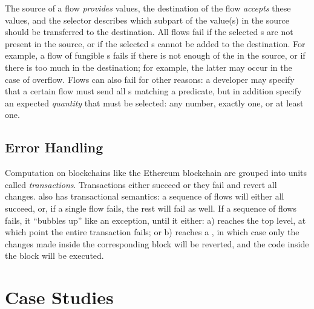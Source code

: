 \documentclass[dvipsnames, usenames, sigconf]{acmart}
\begin{document}
The source of a flow \emph{provides} values, the destination of the flow \emph{accepts} these values, and the selector describes which subpart of the value(s) in the source should be transferred to the destination.
All flows fail if the selected \assetTxt{}s are not present in the source, or if the selected \assetTxt{}s cannot be added to the destination.
For example, a flow of fungible \assetTxt{}s fails if there is not enough of the \assetTxt in the source, or if there is too much in the destination; for example, the latter may occur in the case of overflow.
Flows can also fail for other reasons: a developer may specify that a certain flow must send all \assetTxt{}s matching a predicate, but in addition specify an expected \emph{quantity} that must be selected: any number, exactly one, or at least one.

\subsection{Error Handling}
Computation on blockchains like the Ethereum blockchain are grouped into units called \emph{transactions}. 
Transactions either succeed or they fail and revert all changes.
\langName also has transactional semantics: a sequence of flows will either all succeed, or, if a single flow fails, the rest will fail as well.
If a sequence of flows fails, it ``bubbles up'' like an exception, until it either: a) reaches the top level, at which point the entire transaction fails; or b) reaches a , in which case only the changes made inside the corresponding  block will be reverted, and the code inside the  block will be executed.

\section{Case Studies}
\end{document}
